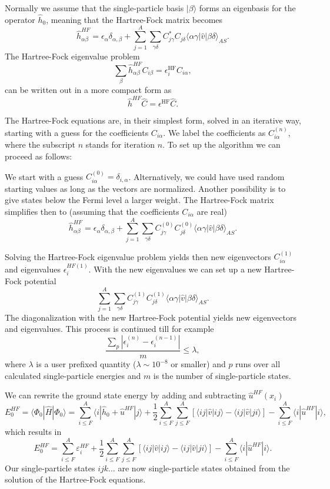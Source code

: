 Normally we assume that the single-particle basis $|\beta\rangle$
forms an eigenbasis for the operator $\hat{h}_0$, meaning that the
Hartree-Fock matrix becomes
\[
\hat{h}_{\alpha\beta}^{HF}=\epsilon_{\alpha}\delta_{\alpha,\beta}+
\sum_{j=1}^A\sum_{\gamma\delta} C^*_{j\gamma}C_{j\delta}\langle \alpha\gamma|\hat{v}|\beta\delta\rangle_{AS}.
\]
The Hartree-Fock eigenvalue problem
\[
\sum_{\beta}\hat{h}_{\alpha\beta}^{HF}C_{i\beta}=\epsilon_i^{\mathrm{HF}}C_{i\alpha},
\]
can be written out in a more compact form as
\[
\hat{h}^{HF}\hat{C}=\epsilon^{\mathrm{HF}}\hat{C}. 
\]




The Hartree-Fock equations are, in their simplest form, solved in an
iterative way, starting with a guess for the coefficients
$C_{i\alpha}$. We label the coefficients as $C_{i\alpha}^{(n)}$, where
the subscript $n$ stands for iteration $n$.  To set up the algorithm
we can proceed as follows:

We start with a guess
$C_{i\alpha}^{(0)}=\delta_{i,\alpha}$. Alternatively, we could have
used random starting values as long as the vectors are
normalized. Another possibility is to give states below the Fermi
level a larger weight.  The Hartree-Fock matrix simplifies then to
(assuming that the coefficients $C_{i\alpha} $ are real)
\[
\hat{h}_{\alpha\beta}^{HF}=\epsilon_{\alpha}\delta_{\alpha,\beta}+
\sum_{j = 1}^A\sum_{\gamma\delta} C_{j\gamma}^{(0)}C_{j\delta}^{(0)}\langle \alpha\gamma|\hat{v}|\beta\delta\rangle_{AS}.
\]




Solving the Hartree-Fock eigenvalue problem yields then new
eigenvectors $C_{i\alpha}^{(1)}$ and eigenvalues $\epsilon_i^{HF(1)}$.
With the new eigenvalues we can set up a new Hartree-Fock potential
\[
\sum_{j = 1}^A\sum_{\gamma\delta} C_{j\gamma}^{(1)}C_{j\delta}^{(1)}\langle \alpha\gamma|\hat{v}|\beta\delta\rangle_{AS}.
\]
The diagonalization with the new Hartree-Fock potential yields new
eigenvectors and eigenvalues.  This process is continued till for
example
\[
\frac{\sum_{p} |\epsilon_i^{(n)}-\epsilon_i^{(n-1)}|}{m} \le \lambda,  
\]
where $\lambda$ is a user prefixed quantity ($\lambda \sim 10^{-8}$ or
smaller) and $p$ runs over all calculated single-particle energies and
$m$ is the number of single-particle states.


We can rewrite the ground state energy by adding and subtracting
$\hat{u}^{HF}(x_i)$
\[
  E_0^{HF} =\langle \Phi_0 | \hat{H} | \Phi_0\rangle = 
\sum_{i\le F}^A \langle i | \hat{h}_0 +\hat{u}^{HF}| j\rangle+ \frac{1}{2}\sum_{i\le F}^A\sum_{j \le F}^A\left[\langle ij |\hat{v}|ij \rangle-\langle ij|\hat{v}|ji\rangle\right]-\sum_{i\le F}^A \langle i |\hat{u}^{HF}| i\rangle,
\]
which results in
\[
  E_0^{HF}
  = \sum_{i\le F}^A \varepsilon_i^{HF} + \frac{1}{2}\sum_{i\le F}^A\sum_{j \le F}^A\left[\langle ij |\hat{v}|ij \rangle-\langle ij|\hat{v}|ji\rangle\right]-\sum_{i\le F}^A \langle i |\hat{u}^{HF}| i\rangle.
\]
Our single-particle states $ijk\dots$ are now single-particle states
obtained from the solution of the Hartree-Fock equations.



